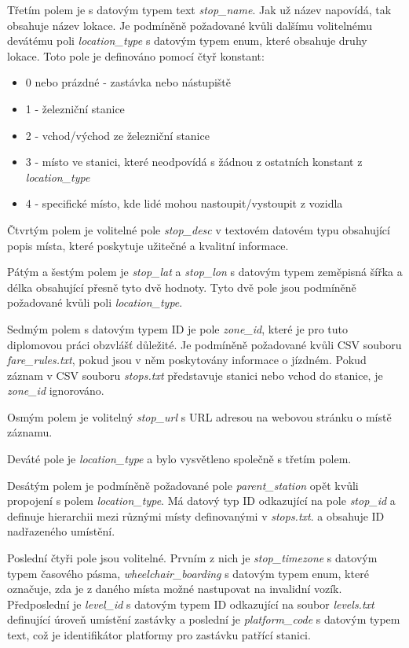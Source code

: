 Třetím polem je s datovým typem text \textit{stop\_name}. Jak už název napovídá, tak obsahuje název lokace. 
Je podmíněně požadované kvůli dalšímu volitelnému devátému poli \textit{location\_type} s datovým typem enum, 
které obsahuje druhy lokace.
Toto pole je definováno pomocí čtyř konstant:
\begin{itemize} 
\item 0 nebo prázdné - zastávka nebo nástupiště
\item 1 - železniční stanice 
\item 2 - vchod/východ ze železniční stanice 
\item 3 - místo ve stanici, které neodpovídá s žádnou z ostatních konstant z \textit{location\_type} 
\item 4 - specifické místo, kde lidé mohou nastoupit/vystoupit z vozidla
\end{itemize}

Čtvrtým polem je volitelné pole \textit{stop\_desc} v textovém datovém typu obsahující popis místa, 
které poskytuje užitečné a kvalitní informace.

Pátým a šestým polem je \textit{stop\_lat} a \textit{stop\_lon} s datovým typem zeměpisná šířka a délka
obsahující přesně tyto dvě hodnoty. Tyto dvě pole jsou podmíněně požadované kvůli poli \textit{location\_type}.

Sedmým polem s datovým typem ID je pole \textit{zone\_id}, které je pro tuto diplomovou práci obzvlášť důležité.
Je podmíněně požadované kvůli CSV souboru \textit{fare\_rules.txt}, pokud jsou v něm poskytovány informace o jízdném.
Pokud záznam v CSV souboru \textit{stops.txt} představuje stanici nebo vchod do stanice, je \textit{zone\_id} ignorováno.

Osmým polem je volitelný \textit{stop\_url} s URL adresou na webovou stránku o místě záznamu.

Deváté pole je \textit{location\_type} a bylo vysvětleno společně s třetím polem.

Desátým polem je podmíněně požadované pole \textit{parent\_station} opět kvůli propojení s polem \textit{location\_type}.
Má datový typ ID odkazující na pole \textit{stop\_id} a definuje hierarchii mezi různými místy definovanými v \textit{stops.txt}. 
a obsahuje ID nadřazeného umístění.

Poslední čtyři pole jsou volitelné. Prvním z nich je \textit{stop\_timezone} s datovým typem časového pásma,
\textit{wheelchair\_boarding} s datovým typem enum, které označuje, zda je z daného místa možné nastupovat na invalidní vozík.
Předposlední je \textit{level\_id} s datovým typem ID odkazující na soubor \textit{levels.txt} defi\-nující úroveň
umístění zastávky a poslední je \textit{platform\_code} s datovým typem text, 
což je identifikátor platformy pro zastávku patřící stanici.

